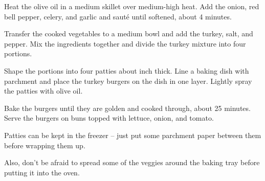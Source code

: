 \begin{method}
  Heat the olive oil in a medium skillet over medium-high heat.
  Add the onion, red bell pepper, celery, and garlic
  and saut\'e until softened, about 4 minutes.

  Transfer the cooked vegetables to a medium bowl
  and add the turkey, salt, and pepper.
  Mix the ingredients together and divide the
  turkey mixture into four portions.

  Shape the portions into four patties about
   inch thick.
  Line a baking dish with parchment and place
  the turkey burgers on the dish in one layer.
  Lightly spray the patties with olive oil.

  Bake the burgers until they are golden and
  cooked through, about 25 minutes.
  Serve the burgers on buns topped with lettuce,
  onion, and tomato.
\end{method}

\begin{tips}
  Patties can be kept in the freezer --
  just put some parchment paper between them
  before wrapping them up.

  \medskip
  Also, don't be afraid to spread some of the veggies
  around the baking tray before putting it into the oven.
\end{tips}
